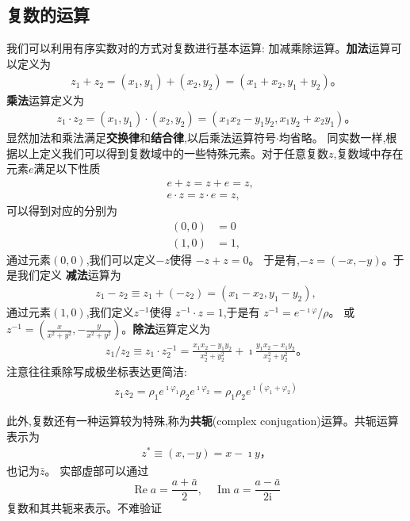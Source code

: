 \subsection{复数的运算}
我们可以利用有序实数对的方式对复数进行基本运算: 加减乘除运算。{\bf 加法}运算可以定义为
\begin{align}
    z_1 + z_2 = (x_1, y_1) + (x_2, y_2) = (x_1 + x_2, y_1 + y_2) 。
\end{align}
{\bf 乘法}运算定义为
\begin{align}
    z_1 \cdot z_2 = (x_1, y_1) \cdot (x_2, y_2) = (x_1 x_2 - y_1 y_2, x_1 y_2 + x_2 y_1) 。
\end{align}
显然加法和乘法满足{\bf 交换律}和{\bf 结合律},以后乘法运算符号$\cdot$均省略。
同实数一样,根据以上定义我们可以得到复数域中的一些特殊元素。对于任意复数$z$,复数域中存在元素$e$满足以下性质
\begin{align}
    & e + z = z + e = z ,\\ 
    & e \cdot z = z \cdot e = z , 
\end{align}
可以得到对应的分别为
\begin{align}
    (0, 0) &= 0\\
    (1, 0) &= 1 ,
\end{align}
通过元素$(0,0)$,我们可以定义$-z$使得 $-z + z = 0$。 于是有,$- z = (-x, -y)$。于是我们定义
{\bf 减法}运算为 
\begin{align}
    z_1 - z_2 \equiv z_1 + (-z_2) = (x_1 - x_2, y_1 - y_2) ,
\end{align}
通过元素$(1,0)$,我们定义$z^{-1}$使得
$z^{-1} \cdot z = 1$,于是有 $z^{-1} =e^{-\imath \varphi}/\rho  $。
或$z^{-1} = (\frac{x}{x^2 + y^2}, -\frac{y}{x^2 + y^2})$。{\bf 除法}运算定义为
\begin{align}
    z_1 / z_2 \equiv z_1 \cdot z_2^{-1} = \frac{x_1 x_2 - y_1 y_2} {x_2^2  +  y_2^2 }  + \imath \frac{y_1 x_2 - x_1 y_2} {x_2^2  +  y_2^2 } 。 
\end{align}
注意往往乘除写成极坐标表达更简洁:
\begin{align}
    z_1 z_2 = \rho_1 e^{\imath \varphi_1 } \rho_2 e^{\imath \varphi_2 } = \rho_1 \rho_2 e^{\imath (\varphi_1 + \varphi_2)}
\end{align}

此外,复数还有一种运算较为特殊,称为{\bf 共轭}(complex conjugation)运算。共轭运算表示为
\begin{align}
    z^{*} \equiv (x, -y) = x - \imath y ，
\end{align}
也记为$\bar{z}$。
实部虚部可以通过
\begin{equation}
    \operatorname{Re} a=\frac{a+\bar{a}}{2}, \quad \operatorname{Im} a=\frac{a-\bar{a}}{2 \mathrm{i}}
\end{equation}
复数和其共轭来表示。不难验证


